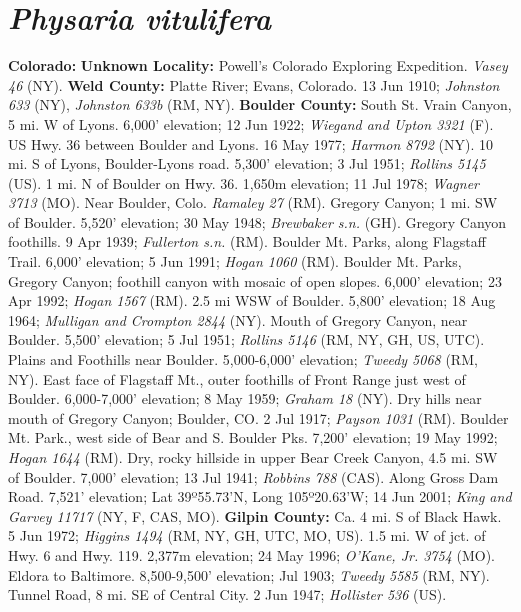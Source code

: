 \section*{\textit{Physaria vitulifera}}

  \textbf{Colorado:}
  \textbf{Unknown Locality:}
Powell's Colorado Exploring Expedition. \textit{Vasey 46} (NY).
  \textbf{Weld County:}
Platte River; Evans, Colorado. 13 Jun 1910; \textit{Johnston 633} (NY),
\textit{Johnston 633b} (RM, NY).
  \textbf{Boulder County:}
South St. Vrain Canyon, 5 mi. W of Lyons. 6,000' elevation; 12 Jun 1922;
\textit{Wiegand and Upton 3321} (F).
US Hwy. 36 between Boulder and Lyons. 16 May 1977; \textit{Harmon 8792} (NY).
10 mi. S of Lyons, Boulder-Lyons road. 5,300' elevation; 3 Jul 1951;
\textit{Rollins 5145} (US).
1 mi. N of Boulder on Hwy. 36. 1,650m elevation; 11 Jul 1978;
\textit{Wagner 3713} (MO).
Near Boulder, Colo. \textit{Ramaley 27} (RM).
Gregory Canyon; 1 mi. SW of Boulder. 5,520' elevation; 30 May 1948;
\textit{Brewbaker s.n.} (GH).
Gregory Canyon foothills. 9 Apr 1939; \textit{Fullerton s.n.} (RM).
Boulder Mt. Parks, along Flagstaff Trail. 6,000' elevation; 5 Jun 1991;
\textit{Hogan 1060} (RM).
Boulder Mt. Parks, Gregory Canyon; foothill canyon with mosaic of open slopes.
6,000' elevation; 23 Apr 1992; \textit{Hogan 1567} (RM).
2.5 mi WSW of Boulder. 5,800' elevation; 18 Aug 1964;
\textit{Mulligan and Crompton 2844} (NY).
Mouth of Gregory Canyon, near Boulder. 5,500' elevation; 5 Jul 1951;
\textit{Rollins 5146} (RM, NY, GH, US, UTC).
Plains and Foothills near Boulder. 5,000-6,000' elevation;
\textit{Tweedy 5068} (RM, NY).
East face of Flagstaff Mt., outer foothills of Front Range just west of Boulder.
6,000-7,000' elevation; 8 May 1959; \textit{Graham 18} (NY).
Dry hills near mouth of Gregory Canyon; Boulder, CO. 2 Jul 1917;
\textit{Payson 1031} (RM).
Boulder Mt. Park., west side of Bear and S. Boulder Pks. 7,200' elevation;
19 May 1992; \textit{Hogan 1644} (RM).
Dry, rocky hillside in upper Bear Creek Canyon, 4.5 mi. SW of Boulder.
7,000' elevation; 13 Jul 1941; \textit{Robbins 788} (CAS).
Along Gross Dam Road. 7,521' elevation; Lat 39º55.73'N, Long 105º20.63'W;
14 Jun 2001; \textit{King and Garvey 11717} (NY, F, CAS, MO).
  \textbf{Gilpin County:}
Ca. 4 mi. S of Black Hawk. 5 Jun 1972;
\textit{Higgins 1494} (RM, NY, GH, UTC, MO, US).
1.5 mi. W of jct. of Hwy. 6 and Hwy. 119. 2,377m elevation; 24 May 1996;
\textit{O'Kane, Jr. 3754} (MO).
Eldora to Baltimore. 8,500-9,500' elevation; Jul 1903;
\textit{Tweedy 5585} (RM, NY).
Tunnel Road, 8 mi. SE of Central City. 2 Jun 1947; \textit{Hollister 536} (US).
